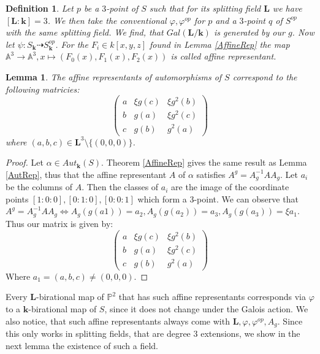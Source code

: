 \documentclass[12pt, oneside, reqno]{amsart}
\newtheorem{lemma}[theorem]{Lemma}
\newtheorem{definition}[theorem]{Definition}
\begin{document}
\begin{definition}
    Let $p$ be a $3$-point of $S$ such that for its splitting field $\textbf{L}$ we have $[\textbf{L}:\textbf{k}]=3$. We then take the conventional $\varphi, \varphi^{op}$ for $p$ and a $3$-point $q$ of $S^{op}$ with the same splitting field. We find, that $Gal({\textbf{L}/\textbf{k}})$ is generated by our $g$. Now let $\psi: S_{\textbf{k}} \dashrightarrow S^{op}_{\textbf{k}}$. For the $F_i \in k[x,y,z]$ found in Lemma \ref{AffineRep} the map $\mathbb{A}^3 \rightarrow \mathbb{A}^3, x \mapsto (F_0(x),F_1(x),F_2(x))$ is called affine representant.
\end{definition}
\noindent
\begin{lemma} \label{matrixL}
    The affine representants of automorphisms of $S$ correspond to the following matricies: 
    \[\begin{pmatrix} 
    a & \xi g(c) & \xi g^2(b) \\
    b & g(a) & \xi g^2(c) \\
    c & g(b) & g^2(a)
\end{pmatrix}\]
where $(a,b,c) \in \textbf{L}^3 \setminus \{ (0,0,0) \}$.
\end{lemma}
\begin{proof}
Let $\alpha \in Aut_{\textbf{k}}(S)$. Theorem \ref{AffineRep} gives the same result as Lemma \ref{AutRep}, thus that the affine representant $A$ of $\alpha$ satisfies $A^g = A_g^{-1} A A_g$. Let $a_i$ be the columns of $A$. Then the classes of $a_i$ are the image of the coordinate points $[1:0:0],[0:1:0],[0:0:1]$ which form a 3-point. We can observe that $A^g = A_g^{-1} A A_g \Leftrightarrow A_g(g(a1)) = a_2, A_g(g(a_2)) = a_3, A_g(g(a_3)) = \xi a_1$. Thus our matrix is given by:
\begin{equation}
\begin{pmatrix} 
    a & \xi g(c) & \xi g^2(b) \\
    b & g(a) & \xi g^2(c) \\
    c & g(b) & g^2(a)
\end{pmatrix} \end{equation}
Where $a_1 = (a,b,c) \neq (0,0,0)$.
\end{proof}
\noindent Every $\textbf{L}$-birational map of $\mathbb{P}^2$ that has such affine representants corresponds via $\varphi$ to a $\textbf{k}$-birational map of $S$, since it does not change under the Galois action. We also notice, that such affine representants always come with $\textbf{L},\varphi, \varphi^{op}, A_g$. Since this only works in splitting fields, that are degree $3$ extensions, we show in the next lemma the existence of such a field. 
\end{document}
